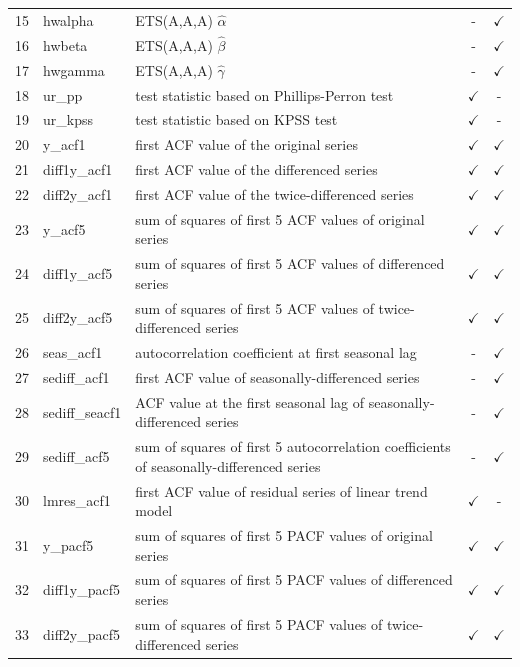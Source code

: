 \documentclass[11pt,a4paper,]{article}
\def\yes{$\checkmark$}
\begin{document}
\begin{table}[!htp]
\begin{tabular}{llp{}cc}
15 & hwalpha        & ETS(A,A,A) $\hat\alpha$                                                                 & -     & \yes \\
16 & hwbeta         & ETS(A,A,A) $\hat\beta$                                                                  & -     & \yes \\
17 & hwgamma        & ETS(A,A,A) $\hat\gamma$                                                                 & -     & \yes \\
18 & ur\_pp         & test statistic based on Phillips-Perron test                                            & \yes  & - \\
19 & ur\_kpss       & test statistic based on KPSS test                                                       & \yes  & - \\
20 & y\_acf1        & first ACF value of the original series                                                  & \yes  & \yes \\
21 & diff1y\_acf1   & first ACF value of the differenced series                                               & \yes  & \yes \\
22 & diff2y\_acf1   & first ACF value of the twice-differenced series                                         & \yes  & \yes \\
23 & y\_acf5        & sum of squares of first 5 ACF values of original series                                 & \yes  & \yes \\
24 & diff1y\_acf5   & sum of squares of first 5 ACF values of differenced series                              & \yes  & \yes \\
25 & diff2y\_acf5   & sum of squares of first 5 ACF values of twice-differenced series                        & \yes  & \yes \\
26 & seas\_acf1     & autocorrelation coefficient at first seasonal lag                                       & -     & \yes \\
27 & sediff\_acf1   & first ACF value of seasonally-differenced series                                        & -     & \yes\\
28 & sediff\_seacf1 & ACF value at the first seasonal lag of seasonally-differenced series                    & -     & \yes \\
29 & sediff\_acf5   & sum of squares of first 5 autocorrelation coefficients of seasonally-differenced series & -     & \yes \\
30 & lmres\_acf1    & first ACF value of residual series of linear trend model                                & \yes  & - \\
31 & y\_pacf5       & sum of squares of first 5 PACF values of original series                                & \yes  & \yes \\
32 & diff1y\_pacf5  & sum of squares of first 5 PACF values of differenced series                             & \yes  & \yes \\
33 & diff2y\_pacf5  & sum of squares of first 5 PACF values of twice-differenced series                       & \yes  & \yes \\
\bottomrule
 \end{tabular}
\end{table}
\end{document}
